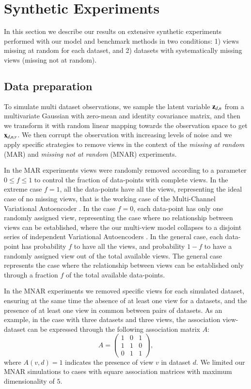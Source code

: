 \section{Synthetic Experiments}

In this section we describe our results on extensive synthetic experiments performed with our model and benchmark methods in two conditions:
1) views missing at random for each dataset,
and 2) datasets with systematically missing views (missing not at random).

\subsection{Data preparation}
\label{ssec:synth}

To simulate multi dataset observations, we sample the latent variable $\mathbf{z}_{d,n}$ from a multivariate Gaussian with zero-mean and identity covariance matrix, and then we transform it with random linear mapping towards the observation space to get $\mathbf{x}_{d,n,v}$.
We then corrupt the observation with increasing levels of noise
and we apply specific strategies to remove views in the context of the \textit{missing at random} (MAR) and \textit{missing not at random} (MNAR) experiments.

In the MAR experiments views were randomly removed according to a parameter $0 \leq f \leq 1$ to control the fraction of data-points with complete views.
In the extreme case $f=1$, all the data-points have all the views, representing the ideal case of no missing views, that is the working case of the Multi-Channel Variational Autoencoder \citep{Antelmi2019}.
In the case $f=0$, each data-point has only one randomly assigned view, representing the case where no relationship between views can be established, where the our multi-view model collapses to a disjoint series of independent Variational Autoencoders \citep{Kingma2013, Rezende2014}.
In the general case, each data-point has probability $f$ to have all the views, and probability $1-f$ to have a randomly assigned view out of the total available views.
The general case represents the case where the relationship between views can be established only through a fraction $f$ of the total available data-points.

In the MNAR experiments we removed specific views for each simulated dataset, ensuring at the same time the absence of at least one view for a datasets, and the presence of at least one view in common between pairs of datasets.
As an example, in the case with three datasets and three views, the association view-dataset can be expressed through the following association matrix $A$:
\begin{equation}
A = 
\begin{pmatrix}
1 & 0 & 1 \\
1 & 1 & 0 \\
0 & 1 & 1 
\end{pmatrix},
\end{equation}
where $A(v,d)=1$ indicates the presence of view $v$ in dataset $d$.
We limited our MNAR simulations to cases with square association matrices with maximum dimensionality of $5$.

